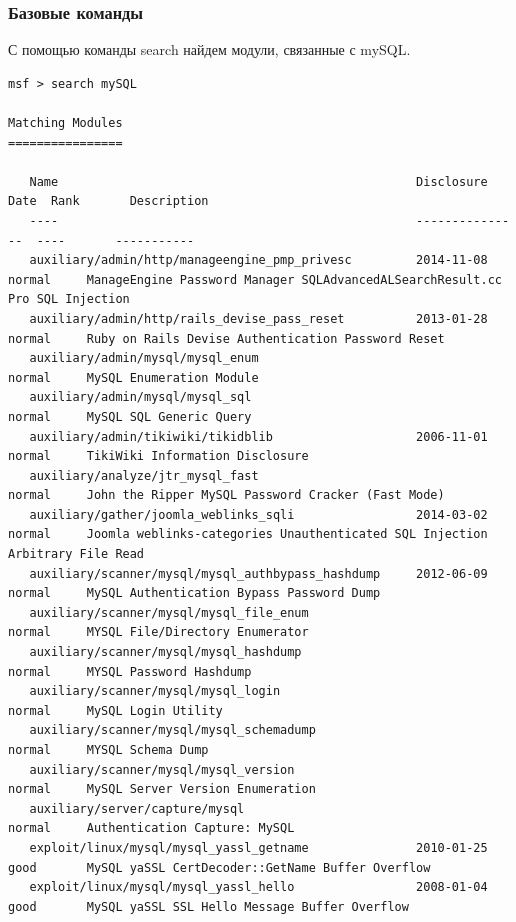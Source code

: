 \documentclass[10pt,a4paper]{report}
\begin{document}
\subsubsection{Базовые команды}
С помощью команды search найдем модули, связанные с mySQL.
\begin{verbatim}
msf > search mySQL

Matching Modules
================

   Name                                                  Disclosure Date  Rank       Description
   ----                                                  ---------------  ----       -----------
   auxiliary/admin/http/manageengine_pmp_privesc         2014-11-08       normal     ManageEngine Password Manager SQLAdvancedALSearchResult.cc Pro SQL Injection
   auxiliary/admin/http/rails_devise_pass_reset          2013-01-28       normal     Ruby on Rails Devise Authentication Password Reset
   auxiliary/admin/mysql/mysql_enum                                       normal     MySQL Enumeration Module
   auxiliary/admin/mysql/mysql_sql                                        normal     MySQL SQL Generic Query
   auxiliary/admin/tikiwiki/tikidblib                    2006-11-01       normal     TikiWiki Information Disclosure
   auxiliary/analyze/jtr_mysql_fast                                       normal     John the Ripper MySQL Password Cracker (Fast Mode)
   auxiliary/gather/joomla_weblinks_sqli                 2014-03-02       normal     Joomla weblinks-categories Unauthenticated SQL Injection Arbitrary File Read
   auxiliary/scanner/mysql/mysql_authbypass_hashdump     2012-06-09       normal     MySQL Authentication Bypass Password Dump
   auxiliary/scanner/mysql/mysql_file_enum                                normal     MYSQL File/Directory Enumerator
   auxiliary/scanner/mysql/mysql_hashdump                                 normal     MYSQL Password Hashdump
   auxiliary/scanner/mysql/mysql_login                                    normal     MySQL Login Utility
   auxiliary/scanner/mysql/mysql_schemadump                               normal     MYSQL Schema Dump
   auxiliary/scanner/mysql/mysql_version                                  normal     MySQL Server Version Enumeration
   auxiliary/server/capture/mysql                                         normal     Authentication Capture: MySQL
   exploit/linux/mysql/mysql_yassl_getname               2010-01-25       good       MySQL yaSSL CertDecoder::GetName Buffer Overflow
   exploit/linux/mysql/mysql_yassl_hello                 2008-01-04       good       MySQL yaSSL SSL Hello Message Buffer Overflow

\end{verbatim}
\end{document}
